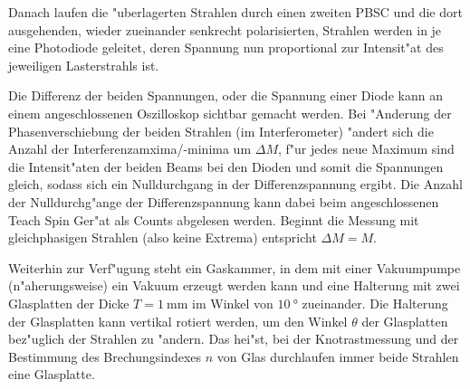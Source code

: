   Danach laufen die "uberlagerten Strahlen durch einen zweiten PBSC und die dort ausgehenden, wieder zueinander senkrecht polarisierten, Strahlen werden in je eine Photodiode geleitet, deren Spannung nun proportional zur Intensit"at des jeweiligen Lasterstrahls ist.

  Die Differenz der beiden Spannungen, oder die Spannung einer Diode kann an einem angeschlossenen Oszilloskop sichtbar gemacht werden.
  Bei "Anderung der Phasenverschiebung der beiden Strahlen (im Interferometer) "andert sich die Anzahl der Interferenzamxima/-minima um $\Delta M$, f"ur jedes neue Maximum sind die Intensit"aten der beiden Beams bei den Dioden und somit die Spannungen gleich, sodass sich ein Nulldurchgang in der Differenzspannung ergibt.
  Die Anzahl der Nulldurchg"ange der Differenzspannung kann dabei beim angeschlossenen Teach Spin Ger"at als Counts abgelesen werden.
  Beginnt die Messung mit gleichphasigen Strahlen (also keine Extrema) entspricht $\Delta M = M$.

  Weiterhin zur Verf"ugung steht ein Gaskammer, in dem mit einer Vakuumpumpe (n"aherungsweise) ein Vakuum erzeugt werden kann und eine Halterung mit zwei Glasplatten der Dicke $T=\SI{1}{\milli \meter}$ im Winkel von $\SI{10}{\degree}$ zueinander.
  Die Halterung der Glasplatten kann vertikal rotiert werden, um den Winkel $\theta$ der Glasplatten bez"uglich der Strahlen zu "andern.
  Das hei"st, bei der Knotrastmessung und der Bestimmung des Brechungsindexes $n$ von Glas durchlaufen immer beide Strahlen eine Glasplatte.



